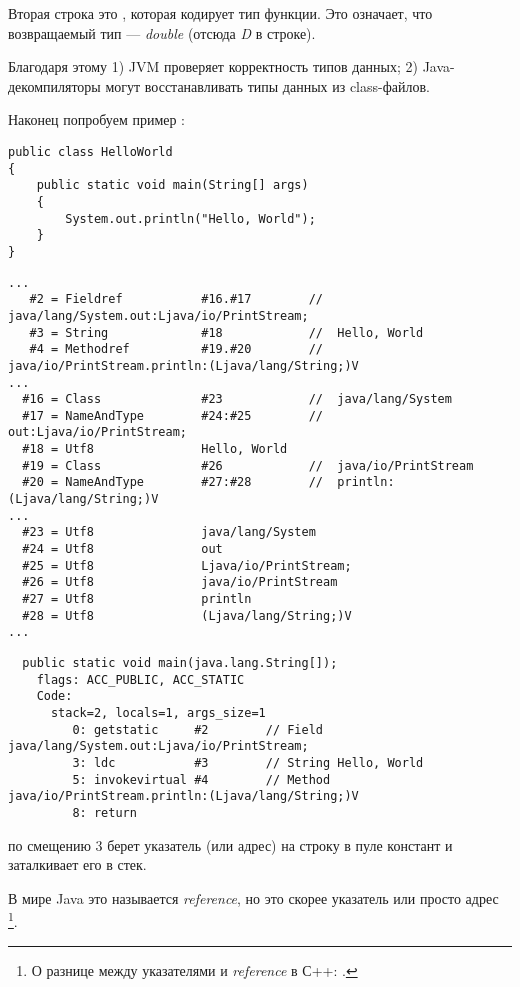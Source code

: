 Вторая строка это , которая кодирует тип функции. Это означает, что возвращаемый тип --- \emph{double} (отсюда \emph{D} в строке).

Благодаря этому
1) JVM проверяет корректность типов данных; 
2) Java-декомпиляторы могут восстанавливать типы данных из class-файлов.


Наконец попробуем пример :

\begin{lstlisting}[style=customjava]
public class HelloWorld
{
	public static void main(String[] args)
	{
		System.out.println("Hello, World");
	}
}
\end{lstlisting}

\begin{lstlisting}[caption=Constant pool]
...
   #2 = Fieldref           #16.#17        //  java/lang/System.out:Ljava/io/PrintStream;
   #3 = String             #18            //  Hello, World
   #4 = Methodref          #19.#20        //  java/io/PrintStream.println:(Ljava/lang/String;)V
...
  #16 = Class              #23            //  java/lang/System
  #17 = NameAndType        #24:#25        //  out:Ljava/io/PrintStream;
  #18 = Utf8               Hello, World
  #19 = Class              #26            //  java/io/PrintStream
  #20 = NameAndType        #27:#28        //  println:(Ljava/lang/String;)V
...
  #23 = Utf8               java/lang/System
  #24 = Utf8               out
  #25 = Utf8               Ljava/io/PrintStream;
  #26 = Utf8               java/io/PrintStream
  #27 = Utf8               println
  #28 = Utf8               (Ljava/lang/String;)V
...
\end{lstlisting}

\begin{lstlisting}
  public static void main(java.lang.String[]);
    flags: ACC_PUBLIC, ACC_STATIC
    Code:
      stack=2, locals=1, args_size=1
         0: getstatic     #2        // Field java/lang/System.out:Ljava/io/PrintStream;
         3: ldc           #3        // String Hello, World
         5: invokevirtual #4        // Method java/io/PrintStream.println:(Ljava/lang/String;)V
         8: return        
\end{lstlisting}


 по смещению 3 берет указатель (или адрес) на строку 
в пуле констант и заталкивает его в стек.

В мире Java это называется \emph{reference}, но это скорее указатель или просто адрес
\footnote{О разнице между указателями и \emph{reference} в С++: .}.


